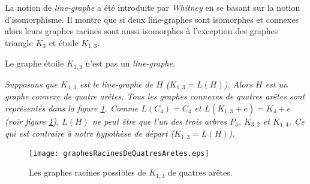 La notion de {\em line-graphe} a \'et\'e introduite par {\em Whitney} \cite{whitney1932congruent} en se basant sur la notion d'isomorphisme. Il montre que  si deux line-graphes sont isomorphes et connexes alors leurs graphes racines sont aussi isomorphes \`a l'exception des graphes triangle $K_3$ et \'etoile $K_{1,3}$. 
\begin{proposition} \cite{lineGraphe}
Le graphe \'etoile $K_{1,3}$ n'est pas un {\em line-graphe}.
\end{proposition}
\begin{Proof}
{\em
Supposons que $K_{1,3}$ est le line-graphe de $H$ ($K_{1,3} = L(H)$). 
Alors $H$ est un graphe connexe de quatre ar\^etes.
Tous les graphes connexes de quatres ar\^etes sont repr\'esent\'es dans la figure  \ref{graphesRacinesDeQuatresAretes}. 
Comme $L(C_4) = C_4$  et $L(K_{1,3} + e) = K_4 + e$ (voir figure \ref{graphesRacinesDeQuatresAretes}), $L(H)$ ne peut \^etre que l'un des trois arbres $P_4$, $K_{3,2}$ et $K_{1,4}$.
Ce qui est contraire \`a notre hypoth\`ese de d\'epart ($K_{1,3} = L(H)$).}
\end{Proof}
\begin{figure}[htb!]\vspace{-0.5em}
	\centering
	\texttt{[image: graphesRacinesDeQuatresAretes.eps]}\vspace{-0.5em}
	\caption{ Les graphes racines possibles de $K_{1,3}$ de quatres ar\^etes.}\vspace{-0.5em}
	\label{graphesRacinesDeQuatresAretes}
\end{figure}
\FloatBarrier
\vspace{0.3cm}


